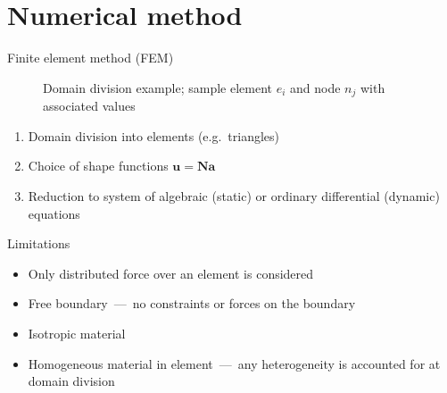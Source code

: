 \documentclass[10pt]{beamer}
\newcommand{\aM}{\mathbf{a}}
\newcommand{\NM}{\mathbf{N}}
\numberwithin{equation}{subsection}
\begin{document}
\section{Numerical method}
\begin{frame}{Finite element method (FEM)}
   \begin{minipage}{0.60\textwidth}
	\begin{figure}
    	\noindent{}
        \caption{Domain division example; sample element $e_i$ and node $n_j$ with associated values}
	\end{figure}
\end{minipage}
\hfill
\begin{minipage}{0.38\textwidth}
	\begin{enumerate}
       \item Domain division into elements (e.g.~triangles)
       \item Choice of shape functions $\mathbf{u} = \NM\aM$
       \item Reduction to system of algebraic (static) or ordinary differential (dynamic) equations
   \end{enumerate}
\end{minipage}	
   
   
\end{frame}
\begin{frame}{Limitations}
    \begin{itemize}
        \item Only distributed force over an element is considered
        \item Free boundary~---~no constraints or forces on the boundary
        \item Isotropic material
        \item Homogeneous material in element~---~any heterogeneity is accounted for at domain division
    \end{itemize}
\end{frame}
\end{document}
